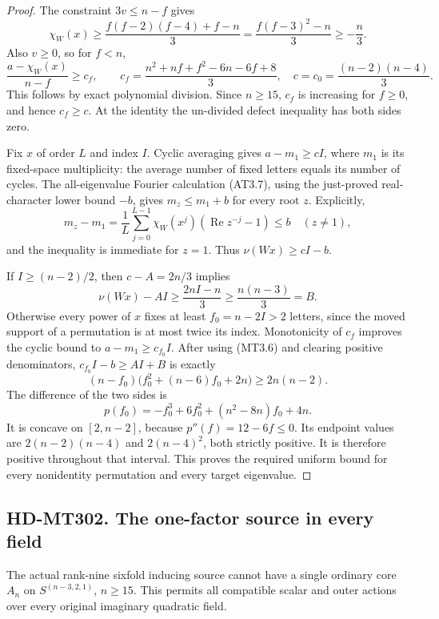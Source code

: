 \begin{proof}
The constraint $3v\le n-f$ gives
\[
 \chi_W(x)\ge\frac{f(f-2)(f-4)+f-n}3
            =\frac{f(f-3)^2-n}3\ge-\frac n3.             \tag{MT3.4}
\]
Also $v\ge0$, so for $f<n$,
\[
 \frac{a-\chi_W(x)}{n-f}\ge c_f,
 \qquad
 c_f=\frac{n^2+nf+f^2-6n-6f+8}3,
 \quad c=c_0=\frac{(n-2)(n-4)}3.                         \tag{MT3.5}
\]
This follows by exact polynomial division. Since $n\ge15$,
$c_f$ is increasing for $f\ge0$, and hence $c_f\ge c$.
At the identity the un-divided defect inequality has both
sides zero.

Fix $x$ of order $L$ and index $I$. Cyclic averaging gives
$a-m_1\ge cI$, where $m_1$ is its fixed-space multiplicity:
the average number of fixed letters equals its number of
cycles. The all-eigenvalue Fourier calculation (AT3.7),
using the just-proved real-character lower bound $-b$,
gives $m_z\le m_1+b$ for every root $z$. Explicitly,
\[
 m_z-m_1=\frac1L\sum_{j=0}^{L-1}\chi_W(x^j)
                 (\operatorname{Re}z^{-j}-1)\le b
 \quad(z\ne1),                                         \tag{MT3.6}
\]
and the inequality is immediate for $z=1$.
Thus $\nu(Wx)\ge cI-b$.

If $I\ge(n-2)/2$, then $c-A=2n/3$ implies
\[
 \nu(Wx)-AI\ge\frac{2nI-n}{3}
                         \ge\frac{n(n-3)}3=B.           \tag{MT3.7}
\]
Otherwise every power of $x$ fixes at least $f_0=n-2I>2$
letters, since the moved support of a permutation is at
most twice its index. Monotonicity of $c_f$ improves the
cyclic bound to $a-m_1\ge c_{f_0}I$.
After using (MT3.6) and clearing positive denominators,
$c_{f_0}I-b\ge AI+B$ is exactly
\[
 (n-f_0)\bigl(f_0^2+(n-6)f_0+2n\bigr)\ge2n(n-2).
                                                                  \tag{MT3.8}
\]
The difference of the two sides is
\[
 p(f_0)=-f_0^3+6f_0^2+(n^2-8n)f_0+4n.                   \tag{MT3.9}
\]
It is concave on $[2,n-2]$, because $p''(f)=12-6f\le0$.
Its endpoint values are $2(n-2)(n-4)$ and $2(n-4)^2$,
both strictly positive. It is therefore positive throughout
that interval. This proves the required uniform bound for
every nonidentity permutation and every target eigenvalue.
\end{proof}

\subsection*{HD-MT302. The one-factor source in every field}

\begin{theorem}[HD-MT302]
The actual rank-nine sixfold inducing source cannot have
a single ordinary core $A_n$ on $S^{(n-3,2,1)}$, $n\ge15$.
This permits all compatible scalar and outer actions over
every original imaginary quadratic field.
\end{theorem}

